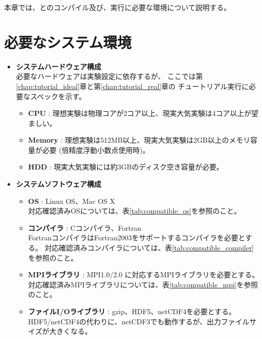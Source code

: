 
本章では、\scalelib と\scalerm のコンパイル及び、実行に必要な環境について説明する。

\section{必要なシステム環境} \label{sec:req_env}

\begin{itemize}
  \item {\bf システムハードウェア構成}\\
必要なハードウェアは実験設定に依存するが、
ここでは第\ref{chap:tutorial_ideal}章と第\ref{chap:tutorial_real}章の
チュートリアル実行に必要なスベックを示す。
  \begin{itemize}
    \item {\bf CPU} : 理想実験は物理コアが2コア以上、現実大気実験は4コア以上が望ましい。
    \item {\bf Memory} : 理想実験は512MB以上、現実大気実験は2GB以上のメモリ容量が必要 (倍精度浮動小数点使用時)。
    \item {\bf HDD} : 現実大気実験には約3GBのディスク空き容量が必要。
  \end{itemize}

  \item {\bf システムソフトウェア構成}
  \begin{itemize}
  \item {\bf OS} : Linux OS、Mac OS X\\
        対応確認済みOSについては、表\ref{tab:compatible_os}を参照のこと。
  \item {\bf コンパイラ} : Cコンパイラ、Fortran\\
        FortranコンパイラはFortran2003をサポートするコンパイラを必要とする。
        対応確認済みコンパイラについては、表\ref{tab:compatible_compiler}を参照のこと。
  \item {\bf MPIライブラリ} : MPI1.0/2.0 に対応するMPIライブラリを必要とする。
        対応確認済みMPIライブラリについては、表\ref{tab:compatible_mpi}を参照のこと。
  \item {\bf ファイルI/Oライブラリ} : gzip、HDF5、netCDF4を必要とする。\\
        HDF5/netCDF4の代わりに、netCDF3でも動作するが、出力ファイルサイズが大きくなる。
  \end{itemize}
\end{itemize}


